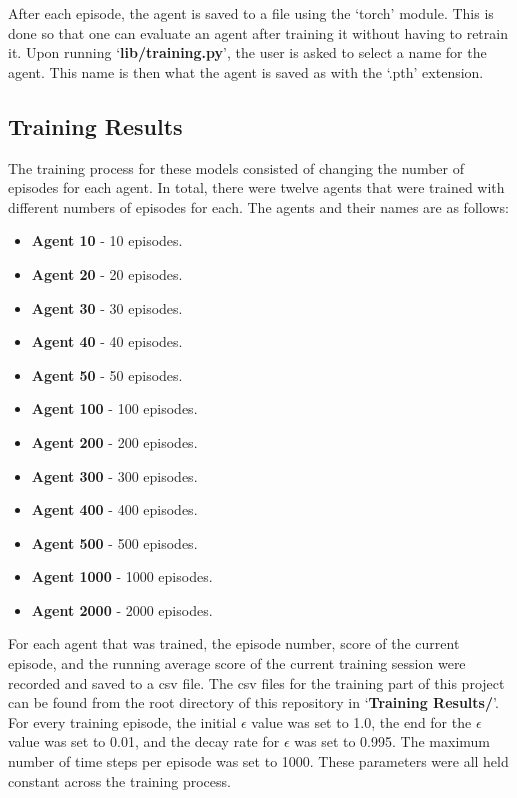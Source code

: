 \documentclass[
	a4paper, %
	10pt, %
	unnumberedsections, %
	twoside, %
]{LTJournalArticle}
\begin{document}
After each episode, the agent is saved to a file using the `torch' module. This is done so that one can evaluate an agent after training it without having to retrain it. Upon running `\textbf{lib/training.py}',
the user is asked to select a name for the agent. This name is then what the agent is saved as with the `.pth' extension.

\subsection{Training Results}

The training process for these models consisted of changing the number of episodes for each agent. In total, there were twelve agents that were trained with different numbers of episodes for each. The
agents and their names are as follows:

\begin{itemize}
	\item \textbf{Agent 10} - 10 episodes.
	\item \textbf{Agent 20} - 20 episodes.
	\item \textbf{Agent 30} - 30 episodes.
	\item \textbf{Agent 40} - 40 episodes.
	\item \textbf{Agent 50} - 50 episodes.
	\item \textbf{Agent 100} - 100 episodes.
	\item \textbf{Agent 200} - 200 episodes.
	\item \textbf{Agent 300} - 300 episodes.
	\item \textbf{Agent 400} - 400 episodes.
	\item \textbf{Agent 500} - 500 episodes.
	\item \textbf{Agent 1000} - 1000 episodes.
	\item \textbf{Agent 2000} - 2000 episodes.
\end{itemize}

For each agent that was trained, the episode number, score of the current episode, and the running average score of the current training session were recorded and saved to a csv file. The csv files
for the training part of this project can be found from the root directory of this repository in `\textbf{Training Results/}'. For every training episode, the initial $\epsilon$ value was set to 1.0,
the end for the $\epsilon$ value was set to 0.01, and the decay rate for $\epsilon$ was set to 0.995. The maximum number of time steps per episode was set to 1000. These parameters were all held constant
across the training process.
\end{document}
